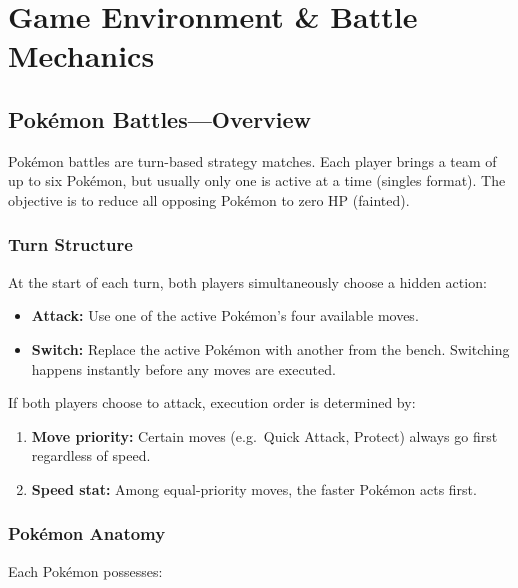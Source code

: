 \chapter{Game Environment \& Battle Mechanics}
\label{ch:game_env}

\section{Pok\'{e}mon Battles---Overview}

Pok\'{e}mon battles are turn-based strategy matches.  Each player brings a team
of up to six Pok\'{e}mon, but usually only one is active at a time (singles
format).  The objective is to reduce all opposing Pok\'{e}mon to zero HP
(fainted).

\subsection{Turn Structure}

At the start of each turn, both players simultaneously choose a hidden action:

\begin{itemize}
  \item \textbf{Attack:} Use one of the active Pok\'{e}mon's four available
        moves.
  \item \textbf{Switch:} Replace the active Pok\'{e}mon with another from the
        bench.  Switching happens instantly before any moves are executed.
\end{itemize}

If both players choose to attack, execution order is determined by:

\begin{enumerate}
  \item \textbf{Move priority:} Certain moves (e.g.\ Quick Attack, Protect)
        always go first regardless of speed.
  \item \textbf{Speed stat:} Among equal-priority moves, the faster
        Pok\'{e}mon acts first.
\end{enumerate}

\subsection{Pok\'{e}mon Anatomy}

Each Pok\'{e}mon possesses:

